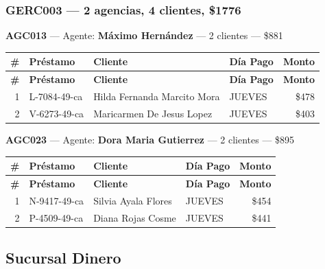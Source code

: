 \documentclass[11pt,a4paper]{article}
\newcommand{\money}[1]{\$\num{#1}}
\begin{document}
\subsubsection{GERC003 --- 2 agencias, 4 clientes, \money{1776}}

\noindent\textbf{AGC013} --- Agente: \textbf{Máximo Hernández} --- 2 clientes --- \money{881}


\begin{center}
\renewcommand{\arraystretch}{1.1}
\footnotesize
\begin{longtable}{rlp{6.5cm}lr}
\toprule
\textbf{\#} & \textbf{Pr\'estamo} & \textbf{Cliente} & \textbf{D\'ia Pago} & \textbf{Monto} \\
\midrule
\endfirsthead
\toprule
\textbf{\#} & \textbf{Pr\'estamo} & \textbf{Cliente} & \textbf{D\'ia Pago} & \textbf{Monto} \\
\midrule
\endhead
1 & L-7084-49-ca & Hilda Fernanda Marcito Mora & JUEVES & \money{478} \\
2 & V-6273-49-ca & Maricarmen De Jesus Lopez & JUEVES & \money{403} \\

\bottomrule
\end{longtable}
\end{center}
\noindent\textbf{AGC023} --- Agente: \textbf{Dora Maria Gutierrez} --- 2 clientes --- \money{895}


\begin{center}
\renewcommand{\arraystretch}{1.1}
\footnotesize
\begin{longtable}{rlp{6.5cm}lr}
\toprule
\textbf{\#} & \textbf{Pr\'estamo} & \textbf{Cliente} & \textbf{D\'ia Pago} & \textbf{Monto} \\
\midrule
\endfirsthead
\toprule
\textbf{\#} & \textbf{Pr\'estamo} & \textbf{Cliente} & \textbf{D\'ia Pago} & \textbf{Monto} \\
\midrule
\endhead
1 & N-9417-49-ca & Silvia Ayala Flores & JUEVES & \money{454} \\
2 & P-4509-49-ca & Diana Rojas Cosme & JUEVES & \money{441} \\

\bottomrule
\end{longtable}
\end{center}
\newpage
\subsection{Sucursal Dinero}
\end{document}
